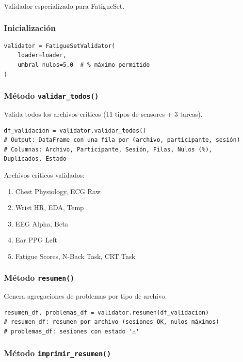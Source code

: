 \documentclass[12pt,a4paper]{article}
\begin{document}
Validador especializado para FatigueSet.

\subsubsection{Inicialización}

\begin{lstlisting}
validator = FatigueSetValidator(
    loader=loader,
    umbral_nulos=5.0  # % máximo permitido
)
\end{lstlisting}

\subsubsection{Método \texttt{validar\_todos()}}

Valida todos los archivos críticos (11 tipos de sensores + 3 tareas).

\begin{lstlisting}
df_validacion = validator.validar_todos()
# Output: DataFrame con una fila por (archivo, participante, sesión)
# Columnas: Archivo, Participante, Sesión, Filas, Nulos (%), Duplicados, Estado
\end{lstlisting}

Archivos críticos validados:
\begin{enumerate}
    \item Chest Physiology, ECG Raw
    \item Wrist HR, EDA, Temp
    \item EEG Alpha, Beta
    \item Ear PPG Left
    \item Fatigue Scores, N-Back Task, CRT Task
\end{enumerate}

\subsubsection{Método \texttt{resumen()}}

Genera agregaciones de problemas por tipo de archivo.

\begin{lstlisting}
resumen_df, problemas_df = validator.resumen(df_validacion)
# resumen_df: resumen por archivo (sesiones OK, nulos máximos)
# problemas_df: sesiones con estado '⚠️'
\end{lstlisting}

\subsubsection{Método \texttt{imprimir\_resumen()}}
\end{document}
